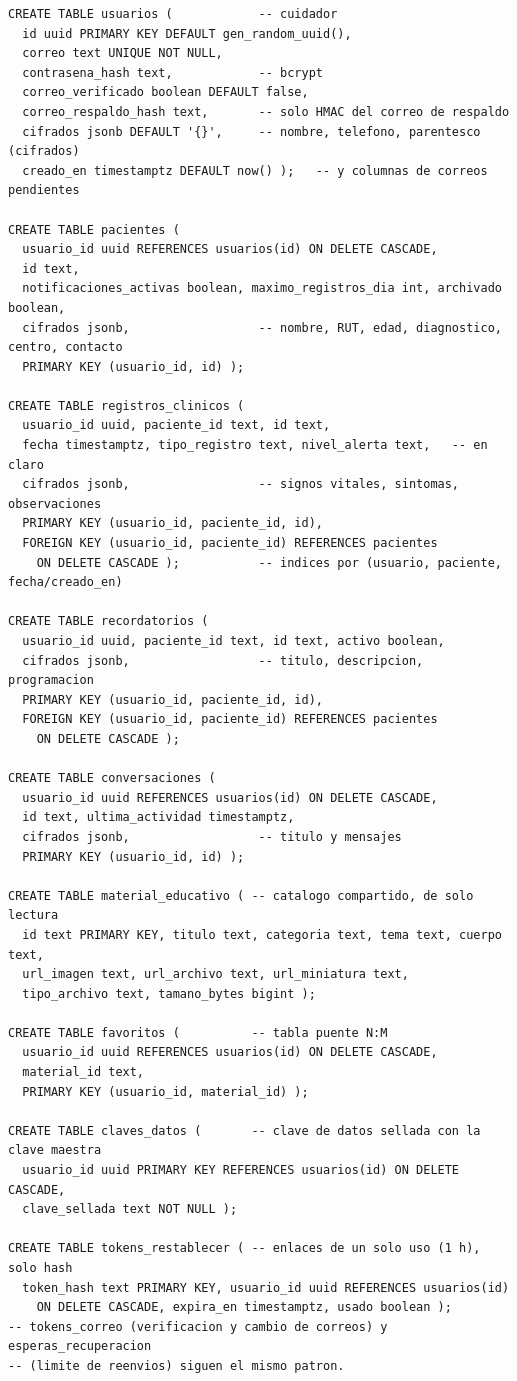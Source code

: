 \begin{lstlisting}[language={},basicstyle=\ttfamily\fontsize{7.2pt}{8.6pt}\selectfont,columns=fullflexible,breaklines=true,caption={Esquema relacional resumido de OnCuidar (PostgreSQL 15).},label={lst:esquema-sql}]
CREATE TABLE usuarios (            -- cuidador
  id uuid PRIMARY KEY DEFAULT gen_random_uuid(),
  correo text UNIQUE NOT NULL,
  contrasena_hash text,            -- bcrypt
  correo_verificado boolean DEFAULT false,
  correo_respaldo_hash text,       -- solo HMAC del correo de respaldo
  cifrados jsonb DEFAULT '{}',     -- nombre, telefono, parentesco (cifrados)
  creado_en timestamptz DEFAULT now() );   -- y columnas de correos pendientes

CREATE TABLE pacientes (
  usuario_id uuid REFERENCES usuarios(id) ON DELETE CASCADE,
  id text,
  notificaciones_activas boolean, maximo_registros_dia int, archivado boolean,
  cifrados jsonb,                  -- nombre, RUT, edad, diagnostico, centro, contacto
  PRIMARY KEY (usuario_id, id) );

CREATE TABLE registros_clinicos (
  usuario_id uuid, paciente_id text, id text,
  fecha timestamptz, tipo_registro text, nivel_alerta text,   -- en claro
  cifrados jsonb,                  -- signos vitales, sintomas, observaciones
  PRIMARY KEY (usuario_id, paciente_id, id),
  FOREIGN KEY (usuario_id, paciente_id) REFERENCES pacientes
    ON DELETE CASCADE );           -- indices por (usuario, paciente, fecha/creado_en)

CREATE TABLE recordatorios (
  usuario_id uuid, paciente_id text, id text, activo boolean,
  cifrados jsonb,                  -- titulo, descripcion, programacion
  PRIMARY KEY (usuario_id, paciente_id, id),
  FOREIGN KEY (usuario_id, paciente_id) REFERENCES pacientes
    ON DELETE CASCADE );

CREATE TABLE conversaciones (
  usuario_id uuid REFERENCES usuarios(id) ON DELETE CASCADE,
  id text, ultima_actividad timestamptz,
  cifrados jsonb,                  -- titulo y mensajes
  PRIMARY KEY (usuario_id, id) );

CREATE TABLE material_educativo ( -- catalogo compartido, de solo lectura
  id text PRIMARY KEY, titulo text, categoria text, tema text, cuerpo text,
  url_imagen text, url_archivo text, url_miniatura text,
  tipo_archivo text, tamano_bytes bigint );

CREATE TABLE favoritos (          -- tabla puente N:M
  usuario_id uuid REFERENCES usuarios(id) ON DELETE CASCADE,
  material_id text,
  PRIMARY KEY (usuario_id, material_id) );

CREATE TABLE claves_datos (       -- clave de datos sellada con la clave maestra
  usuario_id uuid PRIMARY KEY REFERENCES usuarios(id) ON DELETE CASCADE,
  clave_sellada text NOT NULL );

CREATE TABLE tokens_restablecer ( -- enlaces de un solo uso (1 h), solo hash
  token_hash text PRIMARY KEY, usuario_id uuid REFERENCES usuarios(id)
    ON DELETE CASCADE, expira_en timestamptz, usado boolean );
-- tokens_correo (verificacion y cambio de correos) y esperas_recuperacion
-- (limite de reenvios) siguen el mismo patron.
\end{lstlisting}


